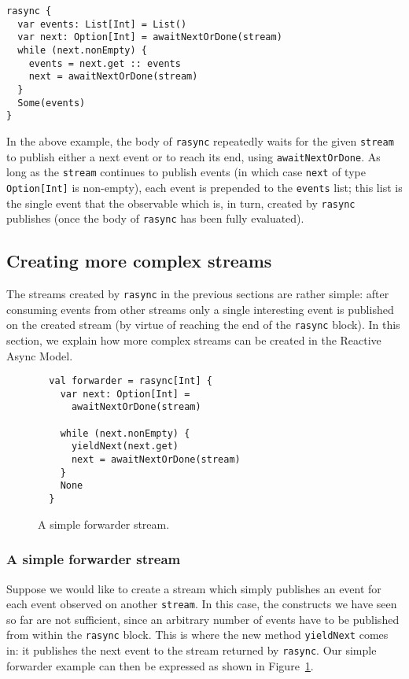 \documentclass{acm_proc_article-sp}
\begin{document}
\begin{lstlisting}
rasync {
  var events: List[Int] = List()
  var next: Option[Int] = awaitNextOrDone(stream)
  while (next.nonEmpty) {
    events = next.get :: events
    next = awaitNextOrDone(stream)
  }
  Some(events)
}
\end{lstlisting}

In the above example, the body of \verb|rasync| repeatedly waits for the given
\verb|stream| to publish either a next event or to reach its end, using
\verb|awaitNextOrDone|. As long as the \verb|stream| continues to publish
events (in which case \verb|next| of type \verb|Option[Int]| is non-empty),
each event is prepended to the \verb|events| list; this list is the single
event that the observable which is, in turn, created by \verb|rasync|
publishes (once the body of \verb|rasync| has been fully evaluated).


\subsection{Creating more complex streams}

The streams created by \verb|rasync| in the previous sections are rather
simple: after consuming events from other streams only a single interesting
event is published on the created stream (by virtue of reaching the end of the
\verb|rasync| block). In this section, we explain how more complex streams can
be created in the Reactive Async Model.

\begin{figure}[ht!]
  \centering
  \begin{lstlisting}
  val forwarder = rasync[Int] {
    var next: Option[Int] =
      awaitNextOrDone(stream)

    while (next.nonEmpty) {
      yieldNext(next.get)
      next = awaitNextOrDone(stream)
    }
    None
  }
  \end{lstlisting}
  \caption{A simple forwarder stream.}
  \label{fig:forwarder}
\end{figure}

\subsubsection{A simple forwarder stream}

Suppose we would like to create a stream which simply publishes an event for
each event observed on another \verb|stream|. In this case, the constructs we
have seen so far are not sufficient, since an arbitrary number of events have
to be published from within the \verb|rasync| block. This is where the new
method \verb|yieldNext| comes in: it publishes the next event to the stream
returned by \verb|rasync|. Our simple forwarder example can then be expressed
as shown in Figure~\ref{fig:forwarder}.
\end{document}
